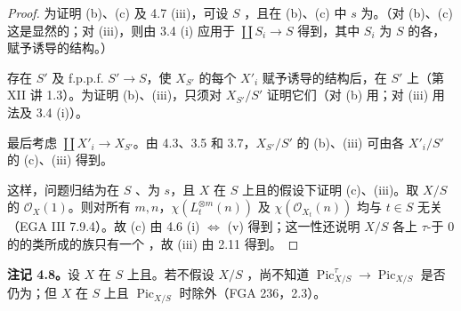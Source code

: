 \begin{proof}
为证明 (b)、(c) 及 4.7 (iii)，可设 $S$ ，且在 (b)、(c) 中 $s$ 为。（对 (b)、(c) 这是显然的；对 (iii)，则由 3.4 (i) 应用于 $\coprod S_i\to S$ 得到，其中 $S_i$ 为 $S$ 的各，赋予诱导的结构。）

存在 $S'$ 及 f.p.p.f.  $S'\to S$，使 $X_{S'}$ 的每个 $X'_i$ 赋予诱导的结构后，在 $S'$ 上（第 XII 讲 1.3）。为证明 (b)、(iii)，只须对 $X_{S'}/S'$ 证明它们（对 (b) 用；对 (iii) 用法及 3.4 (i)）。

最后考虑 $\coprod X'_i\to X_{S'}$。由 4.3、3.5 和 3.7，$X_{S'}/S'$ 的 (b)、(iii) 可由各 $X'_i/S'$ 的 (c)、(iii) 得到。

这样，问题归结为在 $S$ 、为 $s$，且 $X$ 在 $S$ 上且的假设下证明 (c)、(iii)。取 $X/S$ 的 $\mathscr O_X(1)$。则对所有 $m,n$，$\chi(L_t^{\otimes m}(n))$ 及 $\chi(\mathscr O_{X_t}(n))$ 均与 $t\in S$ 无关（EGA III 7.9.4）。故 (c) 由 4.6 (i) $\Longleftrightarrow$ (v) 得到；这一性还说明 $X/S$ 各上 $\tau$-于 $0$ 的的类所成的族只有一个
，故 (iii) 由 2.11 得到。
\end{proof}
\textbf{注记 4.8。}设 $X$ 在 $S$ 上且。若不假设 $X/S$ ，尚不知道 $\operatorname{Pic}^\tau_{X/S}\to\operatorname{Pic}_{X/S}$ 是否仍为；但 $X$ 在 $S$ 上且 $\operatorname{Pic}_{X/S}$ 时除外（FGA 236，2.3）。

